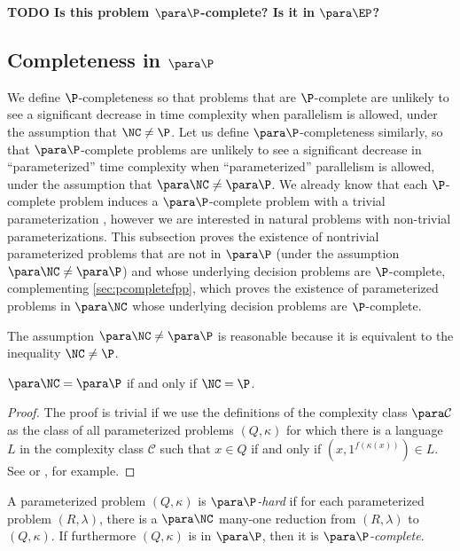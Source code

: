 \documentclass{article}
\newcommand{\todo}[1]{\textbf{TODO #1}}
\begin{document}
\todo{Is this problem $\para \P$-complete? Is it in $\para \EP$?}

\subsection{Completeness in \texorpdfstring{$\para \P$}{paraP}}

We define $\P$-completeness so that problems that are $\P$-complete are unlikely to see a significant decrease in time complexity when parallelism is allowed, under the assumption that $\NC \neq \P$.
Let us define $\para \P$-completeness similarly, so that $\para \P$-complete problems are unlikely to see a significant decrease in ``parameterized'' time complexity when ``parameterized'' parallelism is allowed, under the assumption that $\para \NC \neq \para \P$.
We already know that each $\P$-complete problem induces a $\para \P$-complete problem with a trivial parameterization \autocite[Proposition~14]{fg03}, however we are interested in natural problems with non-trivial parameterizations.
This subsection proves the existence of nontrivial parameterized problems that are not in $\para \P$ (under the assumption $\para \NC \neq \para \P$) and whose underlying decision problems are $\P$-complete, complementing \autoref{sec:pcompletefpp}, which proves the existence of parameterized problems in $\para \NC$ whose underlying decision problems are $\P$-complete.

The assumption $\para \NC \neq \para \P$ is reasonable because it is equivalent to the inequality $\NC \neq \P$.

\begin{proposition}
  $\para \NC = \para \P$ if and only if $\NC = \P$.
\end{proposition}
\begin{proof}
  The proof is trivial if we use the definitions of the complexity class $\para \mathcal{C}$ as the class of all parameterized problems $(Q, \kappa)$ for which there is a language $L$ in the complexity class $\mathcal{C}$ such that $x \in Q$ if and only if $(x, 1^{f(\kappa(x))}) \in L$.
  See \autocite{fg03} or \autocite{est15}, for example.
\end{proof}

\begin{definition}
  A parameterized problem $(Q, \kappa)$ is \emph{$\para \P$-hard} if for each parameterized problem $(R, \lambda)$, there is a $\para \NC$ many-one reduction from $(R, \lambda)$ to $(Q, \kappa)$.
  If furthermore $(Q, \kappa)$ is in $\para \P$, then it is \emph{$\para \P$-complete}.
\end{definition}
\end{document}
